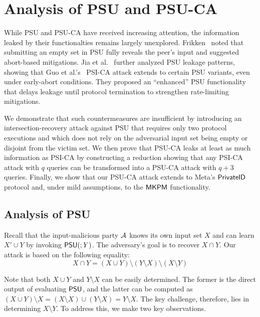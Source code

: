 \section{Analysis of PSU and PSU-CA}

While PSU and PSU-CA have received increasing attention, the information leaked by their functionalties remains largely unexplored. Frikken~\cite{ACNS:Frikken07} noted that submitting an empty set in PSU fully reveals the peer's input and suggested abort-based mitigations. Jia et al.~\cite{USENIX:JSZG24} further analyzed PSU leakage patterns, showing that Guo et al.'s~\cite{USENIX:GHLWJL22} PSI-CA attack extends to certain PSU variants, even under early-abort conditions. They proposed an ``enhanced'' PSU functionality that delays leakage until protocol termination to strengthen rate-limiting mitigations.


We demonstrate that such countermeasures are insufficient by introducing an intersection-recovery attack against PSU that requires only two protocol executions and which does not rely on the adversarial input set being empty or disjoint from the victim set. We then prove that PSU-CA leaks at least as much information as PSI-CA by constructing a reduction showing that any PSI-CA attack with $q$ queries can be transformed into a PSU-CA attack with $q{+}3$ queries. Finally, we show that our PSU-CA attack extends to Meta's $\mathsf{PrivateID}$ protocol and, under mild assumptions, to the $\mathsf{MKPM}$ functionality.


\subsection{Analysis of PSU}\label{sec:psu-attack}

Recall that the input-malicious party $\mathcal{A}$ knows its own input set $X$
and can learn $X' \cup Y$ by invoking $\mathsf{PSU}(;Y)$. The adversary's goal is to recover $X \cap Y$.
Our attack is based on the following equality:
\begin{equation}
	\label{eqn:PSU_basis}
	X \cap Y = (X \cup Y) \setminus (Y \setminus X) \setminus (X \setminus Y)
\end{equation} 

Note that both $X \cup Y$ and $Y \setminus X$ can be easily determined. The former is the direct output of evaluating $\mathsf{PSU}{}$, and the latter can be computed as 
$(X \cup Y) \setminus X = (X \setminus X) \cup (Y \setminus X) = Y \setminus X$.
The key challenge, therefore, lies in determining $X \setminus Y$. To address this, we make two key observations.

